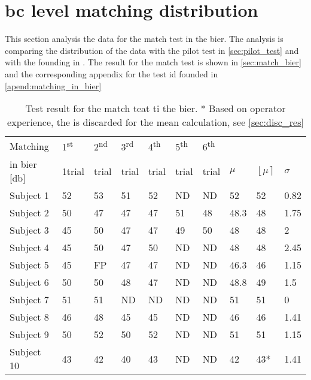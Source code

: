 \section{\gls{bc} level matching distribution}
This section analysis the data for the match test in the \gls{bier}. The analysis is comparing the distribution of the data with the pilot test in \autoref{sec:pilot_test} and with the founding in \citep{STENFELT201385}. The result for the match test is shown in \autoref{sec:match_bier} and the corresponding appendix for the test id founded in \autoref{apend:matching_in_bier}

\begin{table}[H]
\centering
\caption{Test result for the match teat ti the \gls{bier}. * Based on operator experience, the  is discarded for the mean calculation, see \autoref{sec:disc_res}}
\begin{tabular}{llllllllll}
\multicolumn{1}{l|}{Matching }   & 1\textsuperscript{st}  & 2\textsuperscript{nd}  & 3\textsuperscript{rd}  & 4\textsuperscript{th} & 5\textsuperscript{th}  & \multicolumn{1}{l|}{6\textsuperscript{th} }                &    & &  \\
\multicolumn{1}{l|}{in \gls{bier} [\si{\decibel}] }   & 1trial & trial &  trial &  trial &  trial & \multicolumn{1}{l|}{trial}                & $\mu$ & $\left \lfloor  \mu \right \rceil$  & $\sigma$ \\ \hline
\multicolumn{1}{l|}{Subject 1}  & 52    & 53    & 51    & 52    & ND    & \multicolumn{1}{l|}{ND} & 52  & 52 & 0.82  \\
\multicolumn{1}{l|}{Subject 2} & 50    & 47    & 47    & 47    & 51    & \multicolumn{1}{l|}{48} & 48.3 & 48 & 1.75 \\
\multicolumn{1}{l|}{Subject 3}  & 45    & 50    & 47    & 47    & 49    & \multicolumn{1}{l|}{50} & 48  & 48 & 2    \\
\multicolumn{1}{l|}{Subject 4}  & 45    & 50    & 47    & 50    & ND    & \multicolumn{1}{l|}{ND} & 48  &48 & 2.45  \\
\multicolumn{1}{l|}{Subject 5}  & 45    & FP    & 47    & 47    & ND    & \multicolumn{1}{l|}{ND} & 46.3 & 46 & 1.15  \\
\multicolumn{1}{l|}{Subject 6}  & 50    & 50    & 48    & 47    & ND    & \multicolumn{1}{l|}{ND} & 48.8 & 49 & 1.5   \\
\multicolumn{1}{l|}{Subject 7}  & 51    & 51    & ND    & ND    & ND    & \multicolumn{1}{l|}{ND} & 51 &  51& 0     \\
\multicolumn{1}{l|}{Subject 8}  & 46    & 48    & 45    & 45    & ND    & \multicolumn{1}{l|}{ND} & 46  & 46 & 1.41  \\
\multicolumn{1}{l|}{Subject 9}  & 50    & 52    & 50    & 52    & ND    & \multicolumn{1}{l|}{ND} & 51 & 51 & 1.15  \\
\multicolumn{1}{l|}{Subject 10}  & 43    & 42    & 40    & 43    & ND    & \multicolumn{1}{l|}{ND} & 42  & 43* & 1.41
\end{tabular}
\label{tab:match_bier} 
\end{table}



